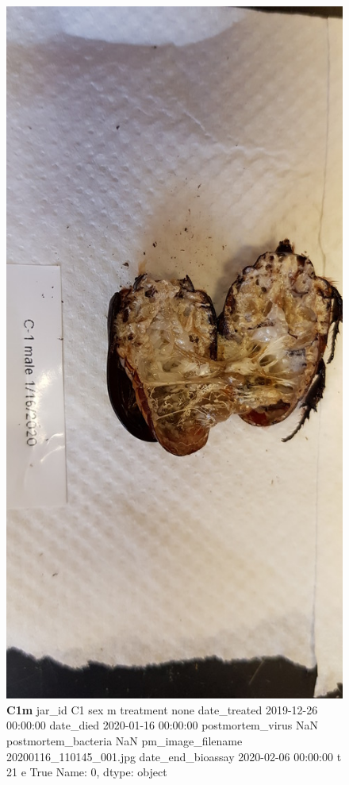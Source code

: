 
\begin{figure}[h!]
\centering
\includegraphics[width=\textwidth]{pm-images/20200116_110145_001.jpg}
\caption{\textbf{C1m} jar\_id                                      C1
sex                                          m
treatment                                 none
date\_treated               2019-12-26 00:00:00
date\_died                  2020-01-16 00:00:00
postmortem\_virus                           NaN
postmortem\_bacteria                        NaN
pm\_image\_filename      20200116\_110145\_001.jpg
date\_end\_bioassay          2020-02-06 00:00:00
t                                           21
e                                         True
Name: 0, dtype: object}
\end{figure}
\clearpage

